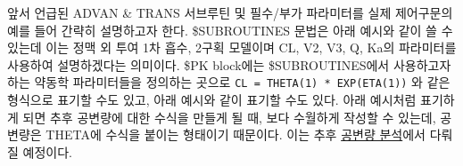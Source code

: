 \documentclass[
  10pt,
  krantz2,
  a4paper]{krantz}
\newenvironment{Shaded}{\begin{snugshade}}{\end{snugshade}}
\newcommand{\DecValTok}[1]{\textcolor[rgb]{0.00,0.00,0.81}{#1}}
\newcommand{\KeywordTok}[1]{\textcolor[rgb]{0.13,0.29,0.53}{\textbf{#1}}}
\newcommand{\NormalTok}[1]{#1}
\newcommand{\OperatorTok}[1]{\textcolor[rgb]{0.81,0.36,0.00}{\textbf{#1}}}
\newcommand{\StringTok}[1]{\textcolor[rgb]{0.31,0.60,0.02}{#1}}
\theoremstyle{definition}
\theoremstyle{definition}
\theoremstyle{definition}
\theoremstyle{remark}
\begin{document}
앞서 언급된 ADVAN \& TRANS 서브루틴 및 필수/부가 파라미터를 실제 제어구문의 예를 들어 간략히 설명하고자 한다. \$SUBROUTINES 문법은 아래 예시와 같이 쓸 수 있는데 이는 정맥 외 투여 1차 흡수, 2구획 모델이며 CL, V2, V3, Q, Ka의 파라미터를 사용하여 설명하겠다는 의미이다. \$PK block에는 \$SUBROUTINES에서 사용하고자 하는 약동학 파라미터들을 정의하는 곳으로 \texttt{CL\ =\ THETA(1)\ *\ EXP(ETA(1))} 와 같은 형식으로 표기할 수도 있고, 아래 예시와 같이 표기할 수도 있다. 아래 예시처럼 표기하게 되면 추후 공변량에 대한 수식을 만들게 될 때, 보다 수월하게 작성할 수 있는데, 공변량은 THETA에 수식을 붙이는 형태이기 때문이다. 이는 추후 \protect\hyperlink{covariate-analysis}{공변량 분석}에서 다뤄질 예정이다.

\begin{Shaded}
\end{Shaded}
\end{document}

